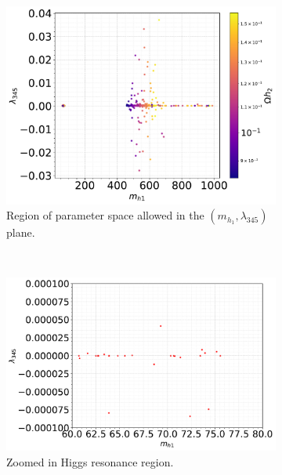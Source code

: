 \documentclass[12pt]{article}
\newcommand{\mhone}{m_{h_1}}
\begin{document}
\begin{figure}[H]
    \centering
    \begin{subfigure}[b]{0.48\textwidth}
        \centering
        \includegraphics[width=\textwidth]{single_plots/l345_against_MD1_Omegah2.pdf}
        \caption{Region of parameter space allowed in the $(\mhone,\lambda_{345})$ plane.}
        \label{fig:MD1_l345_1}
    \end{subfigure}
    \\
    \begin{subfigure}[b]{0.48\textwidth}
        \centering
        \includegraphics[width=\textwidth]{single_plots_(small_range)/l345_against_MD1_Omegah2.pdf}
        \caption{Zoomed in Higgs resonance region.}
        \label{fig:label}
    \end{subfigure}
        \hfill
    \begin{subfigure}[b]{0.48\textwidth}

\end{subfigure}
\end{figure}
\end{document}
